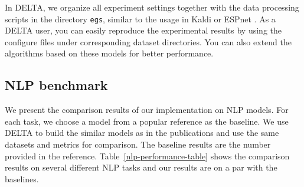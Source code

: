 \documentclass{article}
\begin{document}
In DELTA, we organize all experiment settings together with the data processing scripts in the directory \texttt{egs}, similar to the usage in Kaldi \citep{Povey_ASRU2011} or ESPnet \citep{watanabe2018espnet}. As a DELTA user, you can easily reproduce the experimental results by using the configure files under corresponding dataset directories. You can also extend the algorithms based on these models for better performance.


\subsection{NLP benchmark}
We present the comparison results of our implementation on NLP models. For each task, we choose a model from a popular reference as the baseline. We use DELTA to build the similar models as in the publications and use the same datasets and metrics for comparison. The baseline results are the number provided in the reference. Table~\ref{nlp-performance-table} shows the comparison results on several different NLP tasks and our results are on a par with the baselines.
\end{document}

